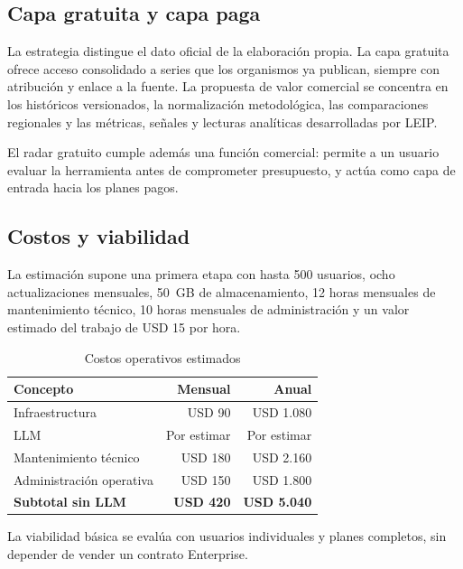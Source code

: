 \documentclass[11pt,a4paper]{article}
\newcommand{\proyectoNombre}{LEIP}
\begin{document}
\subsection{Capa gratuita y capa paga}

La estrategia distingue el dato oficial de la elaboraci\'on propia. La capa
gratuita ofrece acceso consolidado a series que los organismos ya publican,
siempre con atribuci\'on y enlace a la fuente. La propuesta de valor comercial
se concentra en los hist\'oricos versionados, la normalizaci\'on
metodol\'ogica, las comparaciones regionales y las m\'etricas, se\~nales y
lecturas anal\'iticas desarrolladas por \proyectoNombre{}.

El radar gratuito cumple adem\'as una funci\'on comercial: permite a un usuario
evaluar la herramienta antes de comprometer presupuesto, y act\'ua como capa de
entrada hacia los planes pagos.

\subsection{Costos y viabilidad}

La estimaci\'on supone una primera etapa con hasta 500 usuarios, ocho actualizaciones mensuales, 50~GB de almacenamiento, 12 horas
mensuales de mantenimiento t\'ecnico, 10 horas mensuales de administraci\'on y
un valor estimado del trabajo de USD 15 por hora.

\begin{table}[htbp]
\centering
\caption{Costos operativos estimados}
\label{tab:costos}
\begin{tabular}{l r r}
\toprule
\textbf{Concepto} & \textbf{Mensual} & \textbf{Anual} \\
\midrule
Infraestructura           & USD 90  & USD 1.080 \\
LLM                       & Por estimar & Por estimar \\
Mantenimiento t\'ecnico   & USD 180 & USD 2.160 \\
Administraci\'on operativa & USD 150 & USD 1.800 \\
\midrule
\textbf{Subtotal sin LLM} & \textbf{USD 420} & \textbf{USD 5.040} \\
\bottomrule
\end{tabular}
\end{table}

La viabilidad b\'asica se eval\'ua con usuarios individuales y planes completos,
sin depender de vender un contrato Enterprise.
\end{document}
